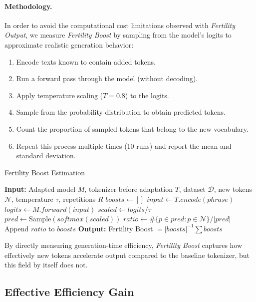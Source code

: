 \paragraph{Methodology.} 
In order to avoid the computational cost limitations observed with \textit{Fertility Output}, we measure \textit{Fertility Boost} by sampling from the model's logits to approximate realistic generation behavior:
\begin{enumerate}
    \item Encode texts known to contain added tokens.
    \item Run a forward pass through the model (without decoding).
    \item Apply temperature scaling ($T = 0.8$) to the logits.
    \item Sample from the probability distribution to obtain predicted tokens.
    \item Count the proportion of sampled tokens that belong to the new vocabulary.
    \item Repeat this process multiple times (10 runs) and report the mean and standard deviation.
\end{enumerate}

\begin{algorithm}[H]
\caption{Fertility Boost Estimation}
\begin{algorithmic}[1]
\State \textbf{Input:} Adapted model $M$, tokenizer before adaptation $T$, dataset $\mathcal{D}$, new tokens $\mathcal{N}$, temperature $\tau$, repetitions $R$
\State $boosts \gets []$
        \State $input \gets T.encode(phrase)$
        \State $logits \gets M.forward(input)$
        \State $scaled \gets logits / \tau$
        \State $pred \gets \text{Sample}(softmax(scaled))$
        \State $ratio \gets \#\{p \in pred : p \in \mathcal{N}\} / |pred|$
        \State Append $ratio$ to $boosts$
    \EndFor
\EndFor
\State \textbf{Output:} Fertility Boost $= |boosts|^{-1}\sum boosts$
\end{algorithmic}
\end{algorithm}

By directly measuring generation-time efficiency, \textit{Fertility Boost} captures how effectively new tokens accelerate output compared to the baseline tokenizer, but this field by itself does not.




\subsection*{\textbf{Effective Efficiency Gain}}
\label{subsec:effective_efficiency}

